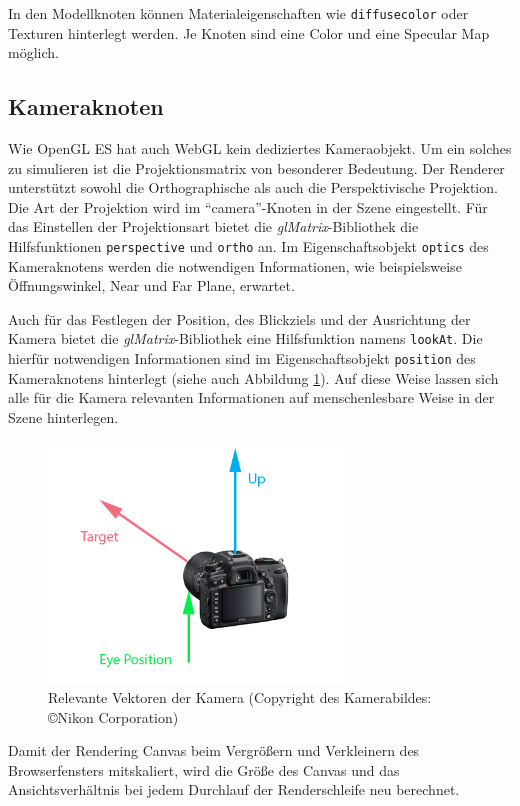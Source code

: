 In den Modellknoten können Materialeigenschaften wie \texttt{diffusecolor} oder Texturen hinterlegt werden. Je Knoten sind eine Color und eine Specular Map möglich.

\subsection{Kameraknoten}
Wie OpenGL ES hat auch WebGL kein dediziertes Kameraobjekt. Um ein solches zu simulieren ist die Projektionsmatrix von besonderer Bedeutung. Der Renderer unterstützt sowohl die Orthographische als auch die Perspektivische Projektion. Die Art der Projektion wird im "`camera"'-Knoten in der Szene eingestellt. Für das Einstellen der Projektionsart bietet die \textit{glMatrix}-Bibliothek die Hilfsfunktionen \texttt{perspective} und \texttt{ortho} an. Im Eigenschaftsobjekt \texttt{optics} des Kameraknotens werden die notwendigen Informationen, wie beispielsweise Öffnungswinkel, Near und Far Plane, erwartet.

Auch für das Festlegen der Position, des Blickziels und der Ausrichtung der Kamera bietet die \textit{glMatrix}-Bibliothek eine Hilfsfunktion namens \texttt{lookAt}. Die hierfür notwendigen Informationen sind im Eigenschaftsobjekt \texttt{position} des Kameraknotens hinterlegt (siehe auch Abbildung \ref{fig:cam}). Auf diese Weise lassen sich alle für die Kamera relevanten Informationen auf menschenlesbare Weise in der Szene hinterlegen.
\begin{figure}
\centering
\includegraphics[width=80mm]{bilder/cam.png}
\caption{Relevante Vektoren der Kamera (Copyright des Kamerabildes: \copyright Nikon Corporation)}
\label{fig:cam}
\end{figure}
Damit der Rendering Canvas beim Vergrößern und Verkleinern des Browserfensters mitskaliert, wird die Größe des Canvas und das Ansichtsverhältnis bei jedem Durchlauf der Renderschleife neu berechnet.

